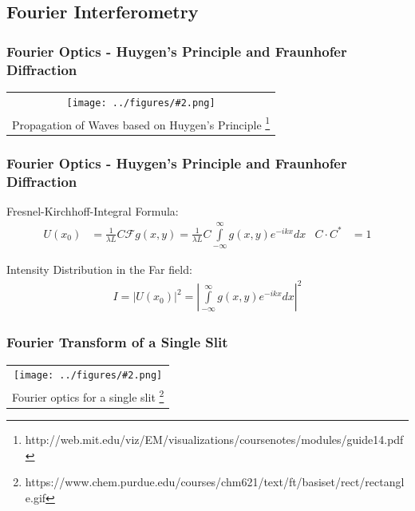 \documentclass{beamer}
\newcommand{\gra}[3][]{
	\begin{table}
	\centering
	\begin{tabular}[width=\textwidth]{c}
		\texttt{[image: ../figures/\#2.png]}\\
		\small #3
	\end{tabular}
	\end{table}
}
\begin{document}
\subsection{Fourier Interferometry}
\frame{\tableofcontents[currentsubsection]}
\begin{frame}
	\frametitle{Fourier Optics - Huygen's Principle and Fraunhofer Diffraction}
	\gra{Huygen}{Propagation of Waves based on Huygen's Principle \footnote{http://web.mit.edu/viz/EM/visualizations/coursenotes/modules/guide14.pdf}}
\end{frame}
\begin{frame}
	\frametitle{Fourier Optics - Huygen's Principle and Fraunhofer Diffraction}
	
	Fresnel-Kirchhoff-Integral Formula:
	\begin{align}
	U(x_0) &= \frac{1}{\lambda L} C \mathscr{F}{g(x, y)}    = \frac{1}{\lambda L} C   \int\limits_{-\infty}^{\infty}  g(x,y)e^{-ikx}dx    &  C  \cdot C^* &= 1       
	\end{align}
	
	Intensity Distribution in the Far field:
	\begin{align}
	I=|U(x_0)|^2=\left| \int\limits_{-\infty}^{\infty} g(x,y)e^{-ikx}dx \right|^2
	\end{align}
\end{frame}
\begin{frame}
	\frametitle{Fourier Transform of a Single Slit}
\gra[0.8]{Einzelspalt}{Fourier optics for a single slit \footnote{https://www.chem.purdue.edu/courses/chm621/text/ft/basiset/rect/rectangle.gif}}
\end{frame}
\end{document}

